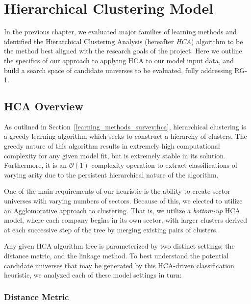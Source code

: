 \documentclass[../main.tex]{subfiles}
\begin{document}
\chapter{Hierarchical Clustering Model} \label{hierarchical_clustering_model}




In the previous chapter, we evaluated major families of learning methods and identified the Hierarchical Clustering Analysis (hereafter \textit{HCA}) algorithm to be the method best aligned with the research goals of the project. Here we outline the specifics of our approach to applying HCA to our model input data, and build a search space of candidate universes to be evaluated, fully addressing RG-1.

\section{HCA Overview}

As outlined in Section~\ref{learning_methods_survey:hca}, hierarchical clustering is a greedy learning algorithm which seeks to construct a hierarchy of clusters. The greedy nature of this algorithm results in extremely high computational complexity for any given model fit, but is extremely stable in its solution. Furthermore, it is an $\mathcal{O}(1)$ complexity operation to extract classifications of varying arity due to the persistent hierarchical nature of the algorithm.

One of the main requirements of our heuristic is the ability to create sector universes with varying numbers of sectors. Because of this, we elected to utilize an Agglomorative approach to clustering. That is, we utilize a \textit{bottom-up} HCA model, where each company begins in its own sector, with larger clusters derived at each successive step of the tree by merging existing pairs of clusters.

Any given HCA algorithm tree is parameterized by two distinct settings; the distance metric, and the linkage method. To best understand the potential candidate universes that may be generated by this HCA-driven classification heuristic, we analyzed each of these model settings in turn:

\subsection{Distance Metric}
\end{document}
